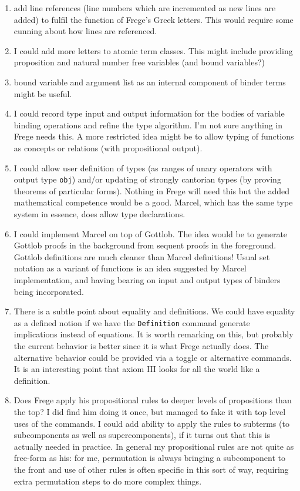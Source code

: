 \documentclass{article}
\begin{document}
\begin{description}
\begin{enumerate}
\item add line references (line numbers which are incremented as new lines are added) to fulfil the function of Frege's Greek letters.  This would require some cunning about
how lines are referenced.

\item  I could add more letters to atomic term classes.  This might include providing proposition and natural number free variables (and bound variables?)

\item  bound variable and argument list as an internal component of binder terms might be useful.

\item I could record type input and output information for the bodies of variable binding operations and refine the type algorithm.  I'm not sure anything in Frege needs this.  A more restricted idea might be to allow typing of functions as concepts or relations (with propositional output).

\item I could allow user definition of types (as ranges of unary operators with output type {\tt obj}) and/or updating of strongly cantorian types (by proving theorems of particular forms).  Nothing in Frege will need this but the added mathematical competence would be a good.  Marcel, which has the same type system in essence, does allow type declarations.

\item  I could implement Marcel on top of Gottlob.  The idea would be to generate Gottlob proofs in the background from sequent proofs in the foreground.  Gottlob definitions are much cleaner than Marcel definitions!  Usual set notation as a variant of functions is an idea suggested by Marcel implementation, and having bearing on input and output types of binders being incorporated.

\item There is a subtle point about equality and definitions.  We could have equality as a defined notion if we have the {\tt Definition} command generate implications instead of
equations.   It is worth remarking on this, but probably the current behavior is better since it is what Frege actually does.  The alternative behavior could be provided via a toggle or alternative commands.  It is an interesting point that axiom III looks for all the world like a definition.

\item  Does Frege apply his propositional rules to deeper levels of propositions than the top?  I did find him doing it once, but managed to fake it with top level uses of the commands.  I could add ability to apply the rules
to subterms (to subcomponents as well as supercomponents), if it turns out that this is actually needed in practice.  In general my propositional rules are not quite as free-form as his:
for me, permutation is always bringing a subcomponent to the front and use of other rules is often specific in this sort of way, requiring extra permutation steps to do more complex things.


\end{enumerate}
\end{description}
\end{document}
